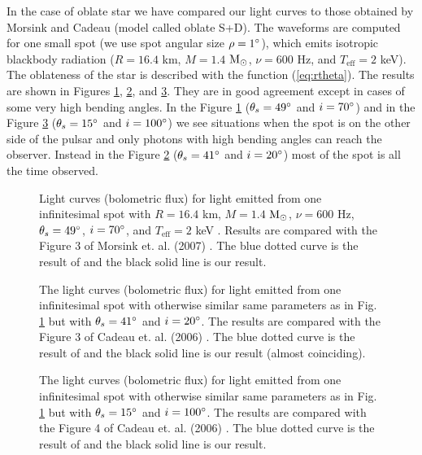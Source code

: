 \documentclass{wihuri}
\def\msun{{\rm M_{\odot}}}
\def\thetas{\theta_{s}}
\begin{document}
In the case of oblate star we have compared our light curves to those obtained by Morsink \cite{morsink} and Cadeau \cite{cadeau} (model called oblate S+D). The waveforms are computed for one small spot (we use spot angular size $\rho = 1 \degree$), which emits isotropic blackbody radiation ($R = 16.4$ km, $M = 1.4$  $\msun$, $\nu = 600$ Hz, and $T_{\mathrm{eff}} = 2$ keV). The oblateness of the star is described with the function (\ref{eq:rtheta}). The results are shown in Figures \ref{fig:mor3}, \ref{fig:cad3}, and \ref{fig:cad4}. They are in good agreement except in cases of some very high bending angles. In the Figure \ref{fig:mor3} ($\thetas = 49 \degree$ and $i = 70 \degree$) and in the Figure \ref{fig:cad4} ($\thetas = 15 \degree$ and $i = 100 \degree$) we see situations when the spot is on the other side of the pulsar and only photons with high bending angles can reach the observer. Instead in the Figure \ref{fig:cad3} ($\thetas = 41 \degree$ and $i = 20 \degree$) most of the spot is all the time observed. 


\begin{figure}
\centerline{}
\caption{Light curves (bolometric flux) for light emitted from one infinitesimal spot with $R = 16.4$ km, $M = 1.4$ $\msun$, $\nu = 600$ Hz, $\thetas = 49 \degree$, $i = 70 \degree$, and $T_{\mathrm{eff}} = 2$ keV . Results are compared with the Figure 3 of Morsink et. al. (2007) \cite{morsink}. The blue dotted curve is the result of \cite{morsink} and the black solid line is our result.
\label{fig:mor3}}
\end{figure}


\begin{figure}
\centerline{}
\caption{The light curves (bolometric flux) for light emitted from one infinitesimal spot with otherwise similar same parameters as in Fig. \ref{fig:mor3} but with $\thetas = 41 \degree$ and $i = 20 \degree$. The results are compared with the Figure 3 of Cadeau et. al. (2006) \cite{cadeau}. The blue dotted curve is the result of \cite{cadeau} and the black solid line is our result (almost coinciding).
\label{fig:cad3}}
\end{figure}


\begin{figure}
\centerline{}
\caption{The light curves (bolometric flux) for light emitted from one infinitesimal spot with otherwise similar same parameters as in Fig. \ref{fig:mor3} but with $\thetas = 15 \degree$ and $i = 100 \degree$. The results are compared with the Figure 4 of Cadeau et. al. (2006) \cite{cadeau}. The blue dotted curve is the result of \cite{cadeau} and the black solid line is our result.
\label{fig:cad4}}
\end{figure}
\end{document}
